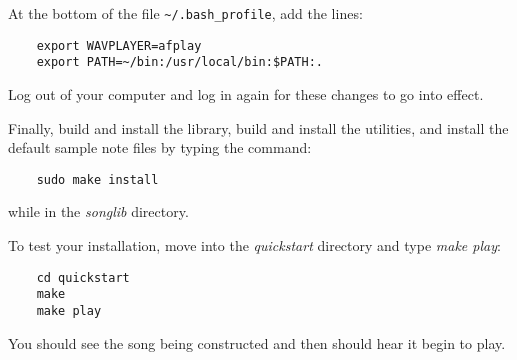 \documentclass{article}
\begin{document}
At the bottom of the file \verb!~/.bash_profile!, add the lines:

\begin{verbatim}
    export WAVPLAYER=afplay
    export PATH=~/bin:/usr/local/bin:$PATH:.
\end{verbatim}

Log out of your computer and log in again
for these changes to go into effect.

Finally, build and install the library, build and install the utilities,
and install the default sample note files by typing the command:

\begin{verbatim}
    sudo make install
\end{verbatim}

while in the {\it songlib} directory.

To test your installation, move into the {\it quickstart} directory and
type {\it make play}:

\begin{verbatim}
    cd quickstart
    make
    make play
\end{verbatim}

You should see the song being constructed and then should hear it
begin to play.
\end{document}
